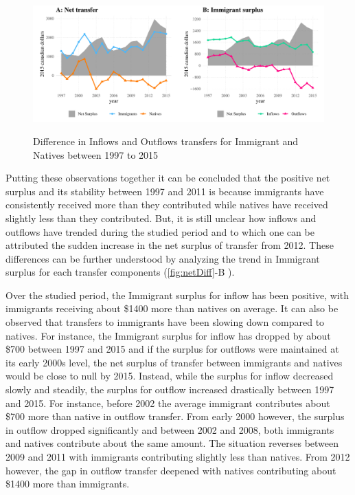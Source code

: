   \begin{figure}[H]%
    \caption{Difference in Inflows and Outflows transfers for Immigrant and Natives between 1997 to 2015}
    \includegraphics[width=1\textwidth]{res/netDiff.pdf}%
    \label{fig:netDiff}%
\end{figure}%

  \vspace{0.7em}\par
  Putting these observations together it can be concluded that the positive net surplus and its stability between 1997 and 2011 is because immigrants have consistently received more than they contributed while natives have received slightly less than they contributed.
But, it is still unclear how inflows and outflows have trended during the studied period and to which one can be attributed the sudden increase in the net surplus of transfer from 2012.
These differences can be further understood by analyzing the trend in Immigrant surplus for each transfer components (\autoref{fig:netDiff}-B ).

  \vspace{0.7em}\par
  Over the studied period, the Immigrant surplus for inflow has been positive, with immigrants receiving about \$1400 more than natives on average.
It can also be observed that transfers to immigrants have been slowing down compared to natives.
For instance, the Immigrant surplus for inflow has dropped by about \$700 between 1997 and 2015 and if the surplus for outflows were maintained at its early 2000s level, the net surplus of transfer between immigrants and natives would be close to null by 2015.
Instead, while the surplus for inflow decreased slowly and steadily, the surplus for outflow increased drastically between 1997 and 2015.
For instance, before 2002 the average immigrant contributes about \$700 more than native in outflow transfer.
From early 2000 however, the surplus in outflow dropped significantly and between 2002 and 2008, both immigrants and natives contribute about the same amount.
The situation reverses between 2009 and 2011 with immigrants contributing slightly less than natives.
From 2012 however, the gap in outflow transfer deepened with natives contributing about \$1400 more than immigrants.

